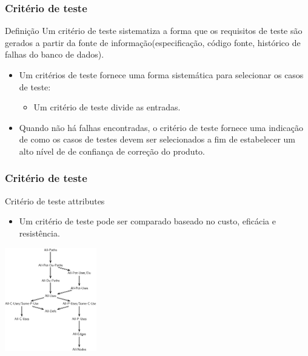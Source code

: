 \begin{frame}[hasprev=true, hasnext=true]
\label{concept:test-criterion}
\frametitle{Critério de teste}

\begin{block:concept}{Definição}
Um critério de teste sistematiza a forma que os requisitos de teste são gerados a partir da fonte de informação(especificação, código fonte, histórico de falhas do banco de dados).
\end{block:concept}

\begin{block:fact}{}
\begin{itemize}
	\item Um critérios de teste fornece uma forma sistemática para selecionar os casos de teste:
	\begin{itemize}
		\item Um critério de teste divide as entradas.
	\end{itemize}

	\item Quando não há falhas encontradas, o critério de teste fornece uma indicação de como os casos de testes devem ser selecionados a fim de estabelecer um alto nível de de confiança de correção do produto.
\end{itemize}
\end{block:fact}


\hfill
{}
\end{frame}


\begin{frame}
\frametitle{Critério de teste}

\begin{block:fact}{Critério de teste attributes}
\begin{itemize}
	\item Um critério de teste pode ser comparado baseado no custo, eficácia e resistência.
\end{itemize}
\end{block:fact}

\begin{block:fact}{}
    \centering
    \includegraphics[width=4cm]{teste-de-software/conceitos-basicos/Imagens/subsume-relation}
\end{block:fact}
\end{frame}


